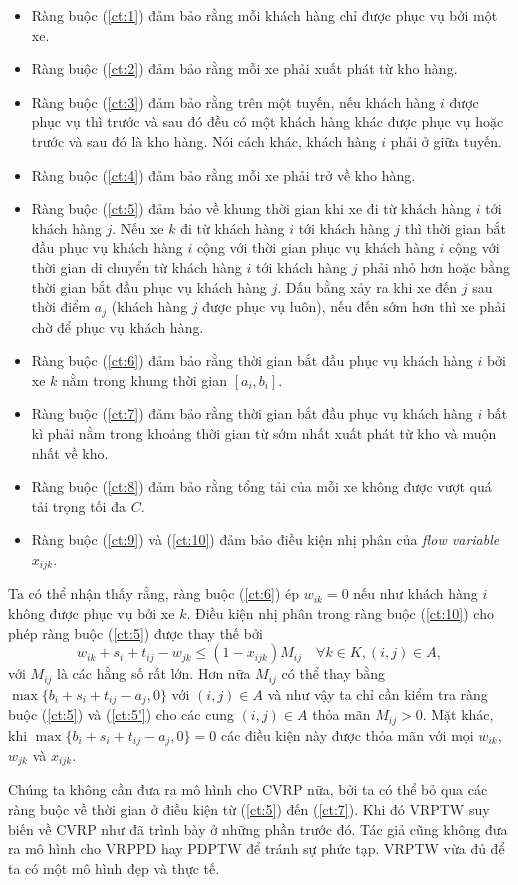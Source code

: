 \begin{itemize}
	\item Ràng buộc (\ref{ct:1}) đảm bảo rằng mỗi khách hàng chỉ được phục vụ bởi một xe.
	\item Ràng buộc (\ref{ct:2}) đảm bảo rằng mỗi xe phải xuất phát từ kho hàng.
	\item Ràng buộc (\ref{ct:3}) đảm bảo rằng trên một tuyến, nếu khách hàng $i$ được phục vụ thì trước và sau đó đều có một khách hàng khác được phục vụ hoặc trước và sau đó là kho hàng. Nói cách khác, khách hàng $i$ phải ở giữa tuyến.
	\item Ràng buộc (\ref{ct:4}) đảm bảo rằng mỗi xe phải trở về kho hàng.
	\item Ràng buộc (\ref{ct:5}) đảm bảo về khung thời gian khi xe đi từ khách hàng $i$ tới khách hàng $j$. Nếu xe $k$ đi từ khách hàng $i$ tới khách hàng $j$ thì thời gian bắt đầu phục vụ khách hàng $i$ cộng với thời gian phục vụ khách hàng $i$ cộng với thời gian di chuyển từ khách hàng $i$ tới khách hàng $j$ phải nhỏ hơn hoặc bằng thời gian bắt đầu phục vụ khách hàng $j$. Dấu bằng xảy ra khi xe đến $j$ sau thời điểm $a_j$ (khách hàng $j$ được phục vụ luôn), nếu đến sớm hơn thì xe phải chờ để phục vụ khách hàng.
	\item Ràng buộc (\ref{ct:6}) đảm bảo rằng thời gian bắt đầu phục vụ khách hàng $i$ bởi xe $k$ nằm trong khung thời gian $[a_i, b_i]$.
	\item Ràng buộc (\ref{ct:7}) đảm bảo rằng thời gian bắt đầu phục vụ khách hàng $i$ bất kì phải nằm trong khoảng thời gian từ sớm nhất xuất phát từ kho và muộn nhất về kho.
	\item Ràng buộc (\ref{ct:8}) đảm bảo rằng tổng tải của mỗi xe không được vượt quá tải trọng tối đa $C$.
	\item Ràng buộc (\ref{ct:9}) và (\ref{ct:10}) đảm bảo điều kiện nhị phân của \textit{flow variable} $x_{ijk}$.
\end{itemize}

Ta có thể nhận thấy rằng, ràng buộc (\ref{ct:6}) ép $w_{ik} = 0$ nếu như khách hàng $i$ không được phục vụ bởi xe $k$. Điều kiện nhị phân trong ràng buộc (\ref{ct:10}) cho phép ràng buộc (\ref{ct:5}) được thay thế bởi
\begin{equation}
	\label{ct:5'}
	w_{ik} + s_i + t_{ij} - w_{jk} \leq (1 - x_{ijk}) M_{ij} \quad \forall k \in K, (i,j) \in A,
\end{equation}
với $M_{ij}$ là các hằng số rất lớn. Hơn nữa $M_{ij}$ có thể thay bằng $\max \{b_i + s_i + t_{ij} - a_j, 0\}$ với $(i,j) \in A$ và như vậy ta chỉ cần kiểm tra ràng buộc (\ref{ct:5}) và (\ref{ct:5'}) cho các cung $(i, j) \in A$ thỏa mãn $M_{ij} > 0$. Mặt khác, khi $\max \{b_i + s_i + t_{ij} - a_j, 0\} = 0$ các điều kiện này được thỏa mãn với mọi $w_{ik}$, $w_{jk}$ và $x_{ijk}$.

Chúng ta không cần đưa ra mô hình cho CVRP nữa, bởi ta có thể bỏ qua các ràng buộc về thời gian ở điều kiện từ (\ref{ct:5}) đến (\ref{ct:7}). Khi đó VRPTW suy biến về CVRP như đã trình bày ở những phần trước đó. Tác giả cũng không đưa ra mô hình cho VRPPD hay PDPTW để tránh sự phức tạp. VRPTW vừa đủ để ta có một mô hình đẹp và thực tế.